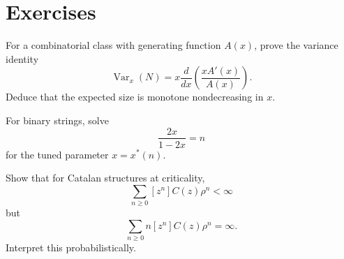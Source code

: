 \section{Exercises}

\begin{exercise}
For a combinatorial class with generating function $A(x)$, prove the variance identity
\[
  \operatorname{Var}_x(N) = x\frac{d}{dx}\left(\frac{xA'(x)}{A(x)}\right).
\]
Deduce that the expected size is monotone nondecreasing in $x$.
\end{exercise}

\begin{exercise}
For binary strings, solve
\[
  \frac{2x}{1-2x}=n
\]
for the tuned parameter $x=x^*(n)$.
\end{exercise}

\begin{exercise}
Show that for Catalan structures at criticality,
\[
  \sum_{n \ge 0} [z^n]C(z)\rho^n < \infty
\]
but
\[
  \sum_{n \ge 0} n [z^n]C(z)\rho^n = \infty.
\]
Interpret this probabilistically.
\end{exercise}
